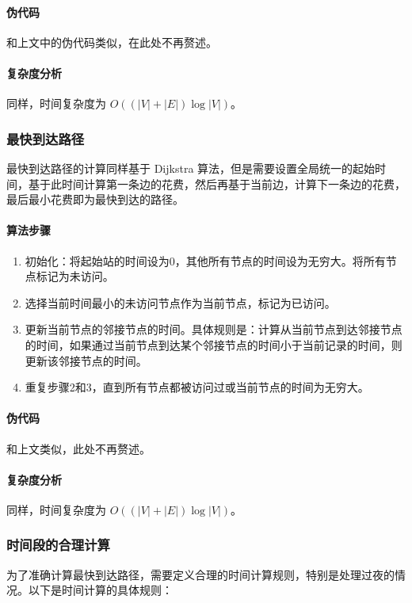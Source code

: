\documentclass[10pt]{article}
\begin{document}
    \paragraph{伪代码} 和上文中的伪代码类似，在此处不再赘述。

    \paragraph{复杂度分析} 同样，时间复杂度为 $O((|V| + |E|) \log |V|)$。

    \subsubsection{最快到达路径}

    最快到达路径的计算同样基于 Dijkstra 算法，但是需要设置全局统一的起始时间，基于此时间计算第一条边的花费，然后再基于当前边，计算下一条边的花费，最后最小花费即为最快到达的路径。

    \paragraph{算法步骤}
    \begin{enumerate}
        \item 初始化：将起始站的时间设为0，其他所有节点的时间设为无穷大。将所有节点标记为未访问。
        \item 选择当前时间最小的未访问节点作为当前节点，标记为已访问。
        \item 更新当前节点的邻接节点的时间。具体规则是：计算从当前节点到达邻接节点的时间，如果通过当前节点到达某个邻接节点的时间小于当前记录的时间，则更新该邻接节点的时间。
        \item 重复步骤2和3，直到所有节点都被访问过或当前节点的时间为无穷大。
    \end{enumerate}

    \paragraph{伪代码} 和上文类似，此处不再赘述。

    \paragraph{复杂度分析} 同样，时间复杂度为 $O((|V| + |E|) \log |V|)$。

    \subsubsection{时间段的合理计算}
    为了准确计算最快到达路径，需要定义合理的时间计算规则，特别是处理过夜的情况。以下是时间计算的具体规则：
\end{document}
